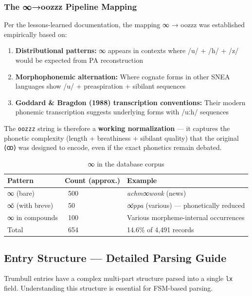 \subsubsection{The ∞→oozzz Pipeline Mapping}

Per the lessons-learned documentation, the mapping ∞ → oozzz was established
empirically based on:
\begin{enumerate}
  \item \textbf{Distributional patterns:} ∞ appears in contexts where /u/ +
    /h/ + /z/ would be expected from PA reconstruction
  \item \textbf{Morphophonemic alternation:} Where cognate forms in other SNEA
    languages show /u/ + preaspiration + sibilant sequences
  \item \textbf{Goddard \& Bragdon (1988) transcription conventions:} Their
    modern phonemic transcription suggests underlying forms with /uːh/
    sequences
\end{enumerate}

The \texttt{oozzz} string is therefore a \textbf{working normalization} --- it
captures the phonetic complexity (length + breathiness + sibilant quality)
that the original ⟨ꝏ⟩ was designed to encode, even if the exact phonetics
remain debated.

\begin{table}[h]
\centering
\begin{tabular}{lll}
\toprule
Pattern & Count (approx.) & Example \\
\midrule
∞ (bare) & ~500 & \textit{achm∞wonk} (news) \\
∞̌ (with breve) & ~50 & \textit{∞̌ppa} (various) --- phonetically reduced \\
∞ in compounds & ~100 & Various morpheme-internal occurrences \\
\midrule
Total & ~654 & 14.6\% of 4,491 records \\
\bottomrule
\end{tabular}
\caption{∞ in the database corpus}
\label{tab:1363-infinity-counts}
\end{table}

\subsection{Entry Structure --- Detailed Parsing Guide}

Trumbull entries have a complex multi-part structure parsed into a single
\texttt{lx} field. Understanding this structure is essential for FSM-based
parsing.

